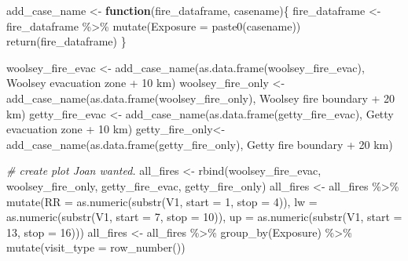 \documentclass[
]{article}
\newenvironment{Shaded}{\begin{snugshade}}{\end{snugshade}}
\newcommand{\AttributeTok}[1]{\textcolor[rgb]{0.77,0.63,0.00}{#1}}
\newcommand{\CommentTok}[1]{\textcolor[rgb]{0.56,0.35,0.01}{\textit{#1}}}
\newcommand{\ControlFlowTok}[1]{\textcolor[rgb]{0.13,0.29,0.53}{\textbf{#1}}}
\newcommand{\DecValTok}[1]{\textcolor[rgb]{0.00,0.00,0.81}{#1}}
\newcommand{\FunctionTok}[1]{\textcolor[rgb]{0.00,0.00,0.00}{#1}}
\newcommand{\NormalTok}[1]{#1}
\newcommand{\OtherTok}[1]{\textcolor[rgb]{0.56,0.35,0.01}{#1}}
\newcommand{\SpecialCharTok}[1]{\textcolor[rgb]{0.00,0.00,0.00}{#1}}
\newcommand{\StringTok}[1]{\textcolor[rgb]{0.31,0.60,0.02}{#1}}
\begin{document}
\begin{Shaded}
\begin{Highlighting}[]
\NormalTok{add\_case\_name }\OtherTok{\textless{}{-}} \ControlFlowTok{function}\NormalTok{(fire\_dataframe, casename)\{}
\NormalTok{  fire\_dataframe }\OtherTok{\textless{}{-}}\NormalTok{ fire\_dataframe }\SpecialCharTok{\%\textgreater{}\%}
    \FunctionTok{mutate}\NormalTok{(}\AttributeTok{Exposure =} \FunctionTok{paste0}\NormalTok{(casename))}
  \FunctionTok{return}\NormalTok{(fire\_dataframe)}
\NormalTok{\}}


\NormalTok{woolsey\_fire\_evac }\OtherTok{\textless{}{-}}
  \FunctionTok{add\_case\_name}\NormalTok{(}\FunctionTok{as.data.frame}\NormalTok{(woolsey\_fire\_evac), }\StringTok{\textquotesingle{}Woolsey evacuation zone + 10 km\textquotesingle{}}\NormalTok{)}
\NormalTok{woolsey\_fire\_only }\OtherTok{\textless{}{-}}
  \FunctionTok{add\_case\_name}\NormalTok{(}\FunctionTok{as.data.frame}\NormalTok{(woolsey\_fire\_only), }\StringTok{\textquotesingle{}Woolsey fire boundary + 20 km\textquotesingle{}}\NormalTok{)}
\NormalTok{getty\_fire\_evac }\OtherTok{\textless{}{-}}
  \FunctionTok{add\_case\_name}\NormalTok{(}\FunctionTok{as.data.frame}\NormalTok{(getty\_fire\_evac), }\StringTok{\textquotesingle{}Getty evacuation zone + 10 km\textquotesingle{}}\NormalTok{)}
\NormalTok{getty\_fire\_only}\OtherTok{\textless{}{-}}
  \FunctionTok{add\_case\_name}\NormalTok{(}\FunctionTok{as.data.frame}\NormalTok{(getty\_fire\_only), }\StringTok{\textquotesingle{}Getty fire boundary + 20 km\textquotesingle{}}\NormalTok{)}

\CommentTok{\# create plot Joan wanted.}
\NormalTok{all\_fires }\OtherTok{\textless{}{-}} \FunctionTok{rbind}\NormalTok{(woolsey\_fire\_evac,}
\NormalTok{                   woolsey\_fire\_only, }
\NormalTok{                   getty\_fire\_evac, }
\NormalTok{                   getty\_fire\_only)}
\NormalTok{all\_fires }\OtherTok{\textless{}{-}}\NormalTok{ all\_fires }\SpecialCharTok{\%\textgreater{}\%} \FunctionTok{mutate}\NormalTok{(}\AttributeTok{RR =} \FunctionTok{as.numeric}\NormalTok{(}\FunctionTok{substr}\NormalTok{(V1, }\AttributeTok{start =} \DecValTok{1}\NormalTok{, }\AttributeTok{stop =} \DecValTok{4}\NormalTok{)),}
                                  \AttributeTok{lw =} \FunctionTok{as.numeric}\NormalTok{(}\FunctionTok{substr}\NormalTok{(V1, }\AttributeTok{start =} \DecValTok{7}\NormalTok{, }\AttributeTok{stop =} \DecValTok{10}\NormalTok{)), }
                                  \AttributeTok{up =} \FunctionTok{as.numeric}\NormalTok{(}\FunctionTok{substr}\NormalTok{(V1, }\AttributeTok{start =} \DecValTok{13}\NormalTok{, }\AttributeTok{stop =} \DecValTok{16}\NormalTok{)))}
\NormalTok{all\_fires }\OtherTok{\textless{}{-}}\NormalTok{ all\_fires }\SpecialCharTok{\%\textgreater{}\%} \FunctionTok{group\_by}\NormalTok{(Exposure) }\SpecialCharTok{\%\textgreater{}\%} \FunctionTok{mutate}\NormalTok{(}\AttributeTok{visit\_type =} \FunctionTok{row\_number}\NormalTok{())}
\end{Highlighting}
\end{Shaded}
\end{document}
